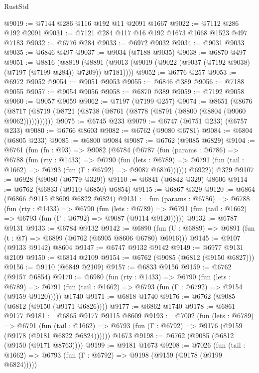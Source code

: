 \begin{lexlean}{RustStd}
\begin{coremodule}
@9019 := @7144 @286 @116 @192 @11 @2091 @1667
@9022 := @7112 @286 @192 @2091
@9031 := @7121 @284 @117 @16 @192 @1673 @1668 @1523 @497 @7183
@9032 := @6776 @284
@9033 := @6972 @9032
@9034 := @9031 @9033
@9035 := @6846 @497
@9037 := @9034 (@7188 @9035)
@9038 := @6870 @497
@9051 := @8816
    (@8819 (@8891 (@9013 (@9019 (@9022 (@9037 (@7192 @9038) (@7197 (@7199 @284)) @7209)) @7181))))
@9052 := @6776 @257
@9053 := @6972 @9052
@9054 := @9051 @9053
@9055 := @6846 @389
@9056 := @7188 @9055
@9057 := @9054 @9056
@9058 := @6870 @389
@9059 := @7192 @9058
@9060 := @9057 @9059
@9062 := @7197 (@7199 @257)
@9074 := @8651
    (@8676 (@8717 (@8719 (@8721 (@8738 (@8761 (@8778 (@8791 (@8800 (@8804 (@9060 @9062)))))))))))
@9075 := @6745 @233
@9079 := @6747 (@6751 @233) (@6757 @233)
@9080 := @6766 @8603
@9082 := @6762 (@9080 @6781)
@9084 := @6804 (@6805 @233)
@9085 := @6800 @9084
@9087 := @6762 (@9085 @6829)
@9104 := @6761
    (fun (fn : @93) =>
    @9082
      (@6784
        (@6787
          (fun (params : @6786) =>
          @6788
            (fun (rty : @1433) =>
            @6790
              (fun (lets : @6789) =>
              @6791 (fun (tail : @1662) => @6793 (fun (Γ : @6792) => @9087 @6876))))))
        @6922))
    @329
@9107 := @6928 (@9080 (@6779 @329))
@9110 := @6841 (@6842 @329) @8606
@9114 := @6762 (@6833 (@9110 @6850) @6854)
@9115 := @6867 @329
@9120 := @6864 (@6866 @9115 @8609 @6822 @6824)
@9131 := fun (params : @6786) =>
  @6788
    (fun (rty : @1433) =>
    @6790
      (fun (lets : @6789) =>
      @6791 (fun (tail : @1662) => @6793 (fun (Γ : @6792) => @9087 (@9114 @9120)))))
@9132 := @6787 @9131
@9133 := @6784 @9132
@9142 := @6890 (fun (U : @6889) => @6891 (fun (t : @7) => @6899 (@6762 (@6905 @8606 @6780) @6916)))
@9145 := @9107 (@9133 @9142) @8604
@9147 := @6747 @9132 @9142
@9149 := @6977 @9131 @2109
@9150 := @6814 @2109
@9154 := @6762 (@9085 (@6812 (@9150 @6827)))
@9156 := @9110 (@6849 @2109)
@9157 := @6833 @9156
@9159 := @6762 (@9157 @6854)
@9170 := @6980
    (fun (rty : @1433) =>
    @6790
      (fun (lets : @6789) =>
      @6791 (fun (tail : @1662) => @6793 (fun (Γ : @6792) => @9154 (@9159 @9120)))))
    @1740
@9171 := @6818 @1740
@9176 := @6762 (@9085 (@6812 (@9150 (@9171 @6826))))
@9177 := @6862 @1740
@9178 := @6861 @9177
@9181 := @6865 @9177 @9115 @8609
@9193 := @7002
    (fun (lets : @6789) =>
    @6791
      (fun (tail : @1662) => @6793 (fun (Γ : @6792) => @9176 (@9159 (@9178 (@9181 @6822 @6824))))))
    @1673
@9198 := @6762 (@9085 (@6812 (@9150 (@9171 @8763))))
@9199 := @9181 @1673
@9208 := @7026
    (fun (tail : @1662) => @6793 (fun (Γ : @6792) => @9198 (@9159 (@9178 (@9199 @6824)))))

\end{coremodule}
\end{lexlean}
